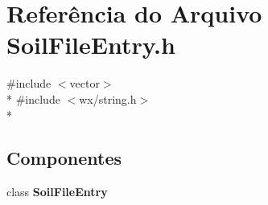 \section{Referência do Arquivo Soil\+File\+Entry.\+h}
\label{_soil_file_entry_8h}
{\ttfamily \#include $<$vector$>$}\\*
{\ttfamily \#include $<$wx/string.\+h$>$}\\*
\subsection*{Componentes}
\begin{DoxyCompactItemize}
\item 
class {\bf Soil\+File\+Entry}
\end{DoxyCompactItemize}
